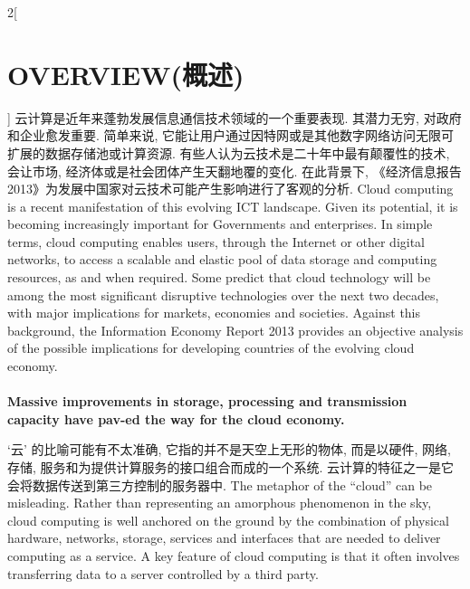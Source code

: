\documentclass[a4paper, UTF8, 12pt]{article}
\begin{document}
\begin{paracol}{2}[\section{OVERVIEW(概述)}]
    \switchcolumn*
    云计算是近年来蓬勃发展信息通信技术领域的一个重要表现. 其潜力无穷, 对政府和企业愈发重要. 简单来说, 它能让用户通过因特网或是其他数字网络访问无限可扩展的数据存储池或计算资源. 有些人认为云技术是二十年中最有颠覆性的技术, 会让市场, 经济体或是社会团体产生天翻地覆的变化. 在此背景下, 《经济信息报告2013》为发展中国家对云技术可能产生影响进行了客观的分析.
    \switchcolumn
    Cloud computing is a recent manifestation of this evolving ICT landscape. Given its potential, it is becoming increasingly important for Governments and enterprises. In simple terms, cloud computing enables users, through the Internet or other digital networks, to access a scalable and elastic pool of data storage and computing resources, as and when required. Some predict that cloud technology will be among the most significant disruptive technologies over the next two decades, with major implications for markets, economies and societies. Against this background, the Information Economy Report 2013 provides an objective analysis of the possible implications for developing countries of the evolving cloud economy.
    
    \switchcolumn*
    \paragraph{} 
    \switchcolumn
    \paragraph{}
    {\bfseries Massive improvements in storage, processing and transmission capacity have pav-ed the way for the cloud economy.} 
    
    \switchcolumn*
    `云' 的比喻可能有不太准确, 它指的并不是天空上无形的物体, 而是以硬件, 网络, 存储, 服务和为提供计算服务的接口组合而成的一个系统. 云计算的特征之一是它会将数据传送到第三方控制的服务器中.
    \switchcolumn
    The metaphor of the “cloud” can be misleading. Rather than representing an amorphous phenomenon in the sky, cloud computing is well anchored on the ground by the combination of physical hardware, networks, storage, services and interfaces that are needed to deliver computing as a service. A key feature of cloud computing is that it often involves transferring data to a server controlled by a third party. 


\end{paracol}
\end{document}
